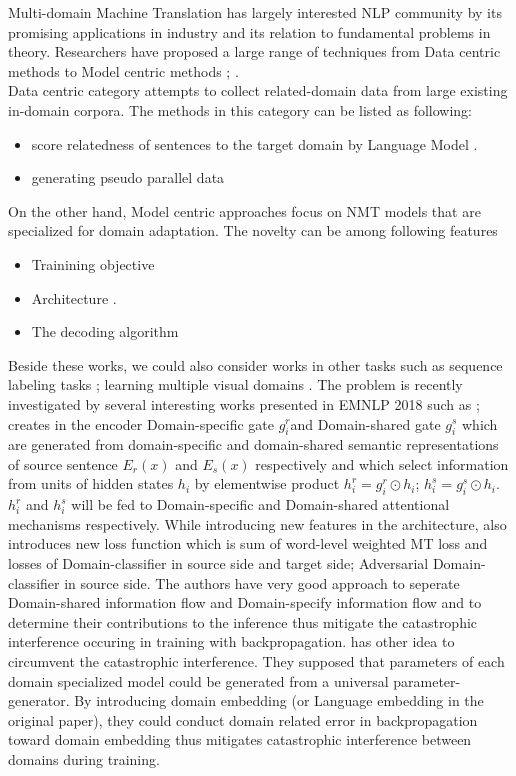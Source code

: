 \documentclass[11pt,a4paper]{article}
\newcommand{\fyTodo}[1]{\Todo[FY>]{\textcolor{orange}{#1}}}
\begin{document}
Multi-domain Machine Translation has largely interested NLP community by its promising applications in industry and its relation to fundamental problems in theory. Researchers have proposed a large range of techniques from Data centric methods to Model centric methods \cite{C18-1111}; \cite{P17-2061}.\\ Data centric category attempts to collect related-domain data from large existing in-domain corpora. The methods in this category can be listed as following:
\fyTodo{Organize refs}
\begin{itemize}
	\item score relatedness of sentences to the target domain by Language Model \cite{P10-2041,D11-1033,P13-2119}.
	\item generating pseudo parallel data \cite{P03-1010,C16-1295,D14-1023}
\end{itemize}
On the other hand, Model centric approaches focus on NMT models that are specialized for domain adaptation. The novelty can be among following features
\begin{itemize}
	\item Trainining objective \cite{Luong2015SNMT,P16-1009,D17-1155,W17-3205,D17-1156,C18-1269}
	\item Architecture \cite{gulcehre2016monolingual,C16-1170,R17-1049,W17-4712,Biao2017CARENMT,N18-2080,W18-6313,P18-2050}.
	\item The decoding algorithm \cite{gulcehre2016monolingual,I17-2004}
\end{itemize} 
Beside these works, we could also consider works in other tasks such as sequence labeling tasks \cite{P07-1033}; learning multiple visual domains \cite{NIPS2017_6654}. The problem is recently investigated by several interesting works presented in EMNLP 2018 such as \cite{D18-1039}; \cite{D18-1041,D18-1041} creates in the encoder Domain-specific gate $g^r_i$and Domain-shared gate $g^s_i$ which are generated from domain-specific and domain-shared semantic representations of source sentence $E_r(x)$ and $E_s(x)$ respectively and which select information from units of hidden states $h_i$ by elementwise product $h^r_i = g^r_i \odot h_i$; $h^s_i = g^s_i \odot h_i$. $h^r_i$ and $h^s_i$ will be fed to Domain-specific and Domain-shared attentional mechanisms respectively. While introducing new features in the architecture, \cite{D18-1041} also introduces new loss function which is sum of word-level weighted MT loss and losses of Domain-classifier in source side and target side; Adversarial Domain-classifier in source side. The authors have very good approach to seperate Domain-shared information flow and Domain-specify information flow and to determine their contributions to the inference thus mitigate the catastrophic interference occuring in training with backpropagation. \cite{D18-1039} has other idea to circumvent the catastrophic interference. They supposed that parameters of each domain specialized model could be generated from a universal parameter-generator. By introducing domain embedding (or Language embedding in the original paper), they could conduct domain related error in backpropagation toward domain embedding thus mitigates catastrophic interference between domains during training.
\end{document}
